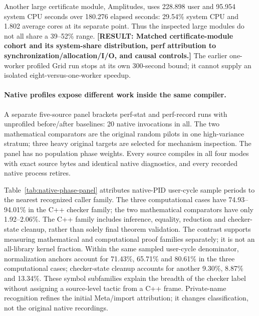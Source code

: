 \documentclass[10pt,twocolumn]{article}
\newcommand{\missing}[1]{\textbf{[RESULT: #1]}}
\begin{document}
Another large certificate module, Amplitudes, uses 228.898 user and
95.954 system CPU seconds over 180.276 elapsed seconds:
29.54\% system CPU and 1.802 average cores at its separate point.
Thus the inspected large modules do not all share a 39--52\% range.
\missing{Matched certificate-module cohort and its system-share distribution,
perf attribution to synchronization/allocation/I/O, and causal controls.}
The earlier one-worker profiled Grid run stops at its own 300-second bound;
it cannot supply an isolated eight-versus-one-worker speedup.

\paragraph{Native profiles expose different work inside the same compiler.}
A separate five-source panel brackets perf-stat and perf-record runs with
unprofiled before/after baselines: 20 native invocations in all.
The two mathematical comparators are the original random pilots in one
high-variance stratum; three heavy original targets are selected for
mechanism inspection. The panel has no population phase weights.
Every source compiles in all four modes with exact source bytes and
identical native diagnostics, and every recorded native process retires.

Table~\ref{tab:native-phase-panel} attributes native-PID user-cycle sample
periods to the nearest recognized caller family.
The three computational cases have 74.93--94.01\% in the C++ checker family;
the two mathematical comparators have only 1.92--2.06\%.
The C++ family includes inference, equality, reduction and checker-state
cleanup, rather than solely final theorem validation.
The contrast supports measuring mathematical and computational proof
families separately; it is not an all-library kernel fraction.
Within the same sampled user-cycle denominator, normalization anchors
account for 71.43\%, 65.71\% and 80.61\% in the three computational
cases; checker-state cleanup accounts for another 9.30\%, 8.87\% and
13.34\%. These symbol subfamilies explain the breadth of the checker
label without assigning a source-level tactic from a C++ frame.
Private-name recognition refines the initial Meta/import attribution;
it changes classification, not the original native recordings.
\end{document}
